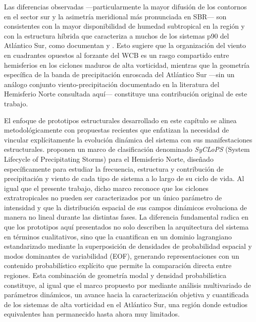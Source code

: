 Las diferencias observadas —particularmente la mayor difusión de los contornos en el sector sur y la asimetría meridional más pronunciada en SBR— son consistentes con la mayor disponibilidad de humedad subtropical en la región y con la estructura híbrida que caracteriza a muchos de los sistemas p90 del Atlántico Sur, como documentan \citet{evans2012climatology} y \citet{gozzo2014subtropical}. Esto sugiere que la organización del viento en cuadrantes opuestos al forzante del WCB es un rasgo compartido entre hemisferios en los ciclones maduros de alta vorticidad, mientras que la geometría específica de la banda de precipitación enroscada del Atlántico Sur —sin un análogo conjunto viento-precipitación documentado en la literatura del Hemisferio Norte consultada aquí— constituye una contribución original de este trabajo.


El enfoque de prototipos estructurales desarrollado en este capítulo se alinea metodológicamente con propuestas recientes que enfatizan la necesidad de vincular explícitamente la evolución dinámica del sistema con sus manifestaciones estructurales. \citet{han2025system} proponen un marco de clasificación denominado \textit{SyCLoPS} (System Lifecycle of Precipitating Storms) para el Hemisferio Norte, diseñado específicamente para estudiar la frecuencia, estructura y contribución de precipitación y viento de cada tipo de sistema a lo largo de su ciclo de vida. Al igual que el presente trabajo, dicho marco reconoce que los ciclones extratropicales no pueden ser caracterizados por un único parámetro de intensidad y que la distribución espacial de sus campos dinámicos evoluciona de manera no lineal durante las distintas fases. La diferencia fundamental radica en que los prototipos aquí presentados no solo describen la arquitectura del sistema en términos cualitativos, sino que la cuantifican en un dominio lagrangiano estandarizado mediante la superposición de densidades de probabilidad espacial y modos dominantes de variabilidad (EOF), generando representaciones con un contenido probabilístico explícito que permite la comparación directa entre regiones. Esta combinación de geometría modal y densidad probabilística constituye, al igual que el marco propuesto por \citet{corner2025classification} mediante análisis multivariado de parámetros dinámicos, un avance hacia la caracterización objetiva y cuantificada de los sistemas de alta vorticidad en el Atlántico Sur, una región donde estudios equivalentes han permanecido hasta ahora muy limitados.

